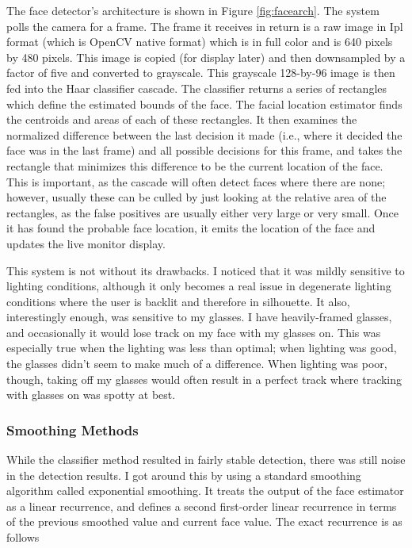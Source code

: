 \documentclass[letterpaper]{article}
\newcommand\figref[1]{Figure \ref{fig:#1}}
\begin{document}
The face detector's architecture is shown in \figref{facearch}. The
system polls the camera for a frame. The frame it receives in return
is a raw image in Ipl format (which is OpenCV native format) which is
in full color and is 640 pixels by 480 pixels. This image is copied
(for display later) and then downsampled by a factor of five and
converted to grayscale. This grayscale 128-by-96 image is then fed
into the Haar classifier cascade. The classifier returns a series of
rectangles which define the estimated bounds of the face. The facial
location estimator finds the centroids and areas of each of these
rectangles. It then examines the normalized difference between the
last decision it made (i.e., where it decided the face was in the last
frame) and all possible decisions for this frame, and takes the
rectangle that minimizes this difference to be the current location of
the face. This is important, as the cascade will often detect faces
where there are none; however, usually these can be culled by just
looking at the relative area of the rectangles, as the false positives
are usually either very large or very small. Once it has found the
probable face location, it emits the location of the face and updates
the live monitor display.

This system is not without its drawbacks. I noticed that it was mildly
sensitive to lighting conditions, although it only becomes a real
issue in degenerate lighting conditions where the user is backlit and
therefore in silhouette. It also, interestingly enough, was sensitive
to my glasses. I have heavily-framed glasses, and occasionally it
would lose track on my face with my glasses on. This was especially
true when the lighting was less than optimal; when lighting was good,
the glasses didn't seem to make much of a difference. When lighting
was poor, though, taking off my glasses would often result in a
perfect track where tracking with glasses on was spotty at best.

\subsubsection{Smoothing Methods}
While the classifier method resulted in fairly stable detection, there
was still noise in the detection results. I got around this by using a
standard smoothing algorithm called exponential smoothing. It treats
the output of the face estimator as a linear recurrence, and defines a
second first-order linear recurrence in terms of the previous smoothed
value and current face value. The exact recurrence is as follows
\end{document}

